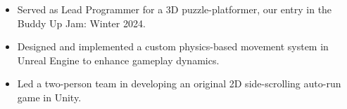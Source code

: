\documentclass[10pt,a4paper,ragged2e,withhyper]{altacv}
\begin{document}
\begin{paracol}{2}
        \vspace{-1em}
            \vspace{-0.5em}
            \begin{itemize}
            \item Served as Lead Programmer for a 3D puzzle-platformer, our entry in the Buddy Up Jam: Winter 2024.
            \item Designed and implemented a custom physics-based movement system in Unreal Engine to enhance gameplay dynamics.
            \end{itemize}
            \vspace{-0.5em}
            \divider
            \vspace{0.5em}
            \vspace{-0.5em}
            \begin{itemize}
            \item Led a two-person team in developing an original 2D side-scrolling auto-run game in Unity.
            \end{itemize}
        \end{paracol}
        \newpage

        \makecvheader
\end{document}
